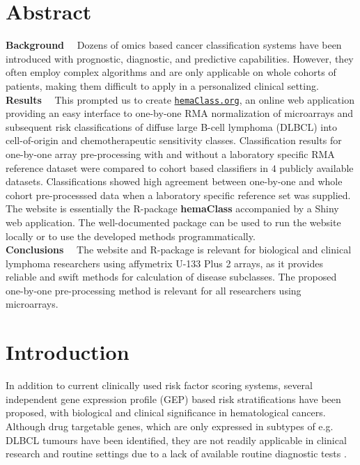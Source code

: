 \documentclass[10pt,letterpaper]{article}
\newcommand{\hemaClass}{\href{http://hemaClass.org}{\texttt{hemaClass.org}}}
\newcommand{\R}{\textsf{R}}
\newcommand{\pkg}[1]{\textbf{#1}}
\newcommand{\parttitle}[1]{\noindent\textbf{#1}~~}
\begin{document}
\section*{Abstract}
\parttitle{Background} %
Dozens of omics based cancer classification systems have been introduced with prognostic, diagnostic, and predictive capabilities.
However, they often employ complex algorithms and are only applicable on whole cohorts of patients, making them difficult to apply in a personalized clinical setting.
\\\parttitle{Results}
This prompted us to create \hemaClass{}, an online web application providing an easy interface to one-by-one RMA normalization of microarrays and subsequent risk classifications of diffuse large B-cell lymphoma (DLBCL) into cell-of-origin and chemotherapeutic sensitivity classes.
Classification results for one-by-one array pre-processing with and without a laboratory specific RMA reference dataset were compared to cohort based classifiers in $4$ publicly available datasets.
Classifications showed high agreement between one-by-one and whole cohort pre-processsed data when a laboratory specific reference set was supplied.
The website is essentially the \R{}-package \pkg{hemaClass} accompanied by a Shiny web application.
The well-documented package can be used to run the website locally or to use the developed methods programmatically.
\\\parttitle{Conclusions}
The website and \R{}-package is relevant for biological and clinical lymphoma researchers using affymetrix U-133 Plus 2 arrays, as it provides reliable and swift methods for calculation of disease subclasses.
The proposed one-by-one pre-processing method is relevant for all researchers using microarrays.
\medskip\\


\linenumbers

\section*{Introduction}
In addition to current clinically used risk factor scoring systems, several independent gene expression profile (GEP) based risk stratifications have been proposed, with biological and clinical significance in hematological cancers.
Although drug targetable genes, which are only expressed in subtypes of e.g. DLBCL tumours have been identified, they are not readily applicable in clinical research and routine settings due to a lack of available routine diagnostic tests \cite{Jaffe2009, Sehn2014}.
\end{document}
